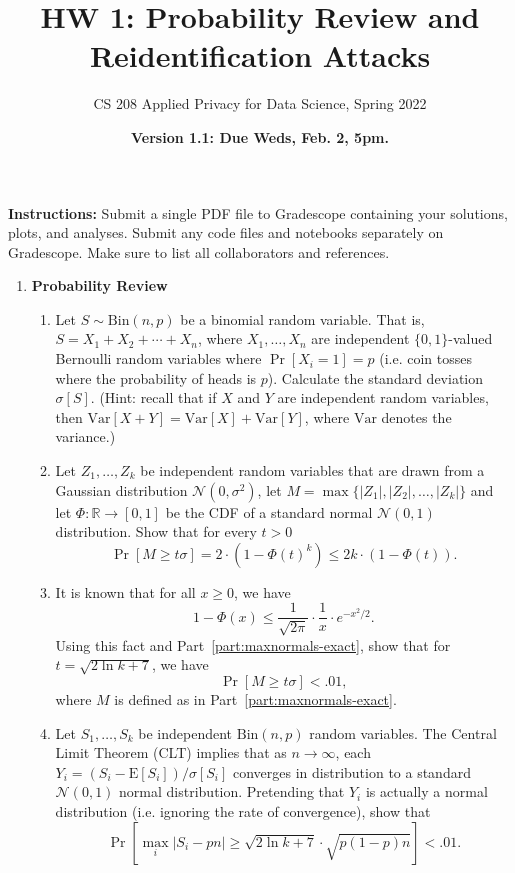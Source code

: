 \documentclass[11pt]{article}
\title{\vspace{-1.5cm} HW 1:  Probability Review and Reidentification Attacks}
\author{CS 208 Applied Privacy for Data Science, Spring 2022}
\date{\textbf{Version 1.1: Due Weds, Feb. 2, 5pm.}}
\newcommand{\Var}{\mathrm{Var}}
\newcommand{\Exp}{\mathrm{E}}
\newcommand{\R}{\mathbb{R}}
\newcommand{\Normal}{\mathcal{N}}
\newcommand{\Bin}{\mathrm{Bin}}
\begin{document}
\maketitle


\vspace{-5ex}

\noindent \textbf{Instructions:} Submit a single PDF file to Gradescope containing your solutions, plots, and analyses. Submit any code files and notebooks separately on Gradescope.  
Make sure to list all collaborators and references.

\begin{enumerate}[leftmargin=*]

\item \textbf{Probability Review}

\begin{enumerate}
    \item  Let $S\sim \Bin(n,p)$ be a binomial random variable.  That is, $S=X_1+X_2+\cdots+X_n$, where 
    $X_1,\ldots,X_n$ are independent $\{0,1\}$-valued Bernoulli random variables where $\Pr[X_i = 1]=p$ (i.e. coin tosses where the probability of heads is $p$).  Calculate the standard deviation $\sigma[S]$.  (Hint: recall that if $X$ and $Y$ are independent random variables, then $\Var[X+Y]=\Var[X]+\Var[Y]$, where $\Var$ denotes the variance.)
    
    \item Let $Z_1,\ldots,Z_k$ be independent random variables that are drawn from a Gaussian distribution $\Normal(0, \sigma^2)$, let $M=\max\{|Z_1|,|Z_2|,\ldots,|Z_k|\}$ and let $\Phi : \R\rightarrow [0,1]$ be the CDF of a standard normal $\Normal(0,1)$ distribution.  Show that for every $t>0$
    $$\Pr[M \geq t\sigma ] = 2\cdot (1-\Phi(t)^k) \leq 2k\cdot (1-\Phi(t)).$$
    \label{part:maxnormals-exact}
    
    \item It is known that for all $x\geq 0$, we have 
    $$1-\Phi(x) \leq \frac{1}{\sqrt{2\pi}}\cdot \frac{1}{x}\cdot e^{-x^2/2}.$$
    Using this fact and Part~\ref{part:maxnormals-exact}, show that for $t = \sqrt{2\ln k+7}$, we have
    $$\Pr[M \geq t\sigma] < .01,$$
    where $M$ is defined as in Part~\ref{part:maxnormals-exact}.
    
    \item Let $S_1,\ldots,S_k$ be independent $\Bin(n,p)$ random variables.  The Central Limit Theorem (CLT) implies that as $n\rightarrow \infty$, each $Y_i=(S_i-\Exp[S_i])/\sigma[S_i]$ converges in distribution to a standard $\Normal(0,1)$ normal distribution. Pretending that $Y_i$ is actually a normal distribution (i.e. ignoring the rate of convergence), show that
    $$\Pr\left[\max_i |S_i-pn| \geq \sqrt{2\ln k + 7} \cdot\sqrt{p(1-p) n}\right] < .01.$$
    

\end{enumerate}
\end{enumerate}
\end{document}
